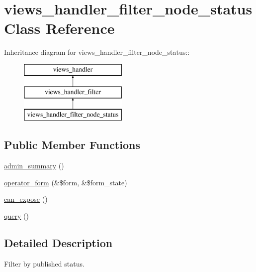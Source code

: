 \hypertarget{classviews__handler__filter__node__status}{
\section{views\_\-handler\_\-filter\_\-node\_\-status Class Reference}
\label{classviews__handler__filter__node__status}
}
Inheritance diagram for views\_\-handler\_\-filter\_\-node\_\-status::\begin{figure}[H]
\begin{center}
\leavevmode
\includegraphics[height=3cm]{classviews__handler__filter__node__status}
\end{center}
\end{figure}
\subsection*{Public Member Functions}
\begin{DoxyCompactItemize}
\item 
\hyperlink{classviews__handler__filter__node__status_afad09e6f2c94d8f6748b48c3ce137a25}{admin\_\-summary} ()
\item 
\hyperlink{classviews__handler__filter__node__status_a667b6e76f34a6665898585ae13cb2842}{operator\_\-form} (\&\$form, \&\$form\_\-state)
\item 
\hyperlink{classviews__handler__filter__node__status_adaece4fdfbc098bb12b83a7cae193cc3}{can\_\-expose} ()
\item 
\hyperlink{classviews__handler__filter__node__status_a4f5351bb3567b5fe8bca111ffca83690}{query} ()
\end{DoxyCompactItemize}


\subsection{Detailed Description}
Filter by published status. 

